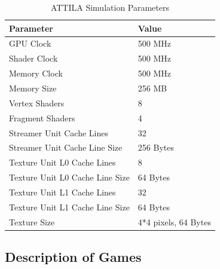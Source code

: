 \documentclass[pageno]{jpaper}
\begin{document}
\begin{table}[h!]
	\centering
	\begin{tabular}{|l|l|}
		\hline
		\textbf{Parameter} & \textbf{Value} \\
		\hline
		\hline
		GPU Clock & 500 MHz \\
		\hline
		Shader Clock & 500 MHz \\
		\hline
		Memory Clock & 500 MHz \\
		\hline
		Memory Size & 256 MB \\
		\hline
		Vertex Shaders & 8 \\
		\hline
		Fragment Shaders & 4 \\
		\hline
		Streamer Unit Cache Lines & 32 \\
		\hline
		Streamer Unit Cache Line Size & 256 Bytes \\
		\hline
		Texture Unit L0 Cache Lines & 8 \\
		\hline
		Texture Unit L0 Cache Line Size & 64 Bytes \\
		\hline
		Texture Unit L1 Cache Lines & 32 \\
		\hline
		Texture Unit L1 Cache Line Size & 64 Bytes \\
		\hline
		Texture Size & 4*4 pixels, 64 Bytes \\
		\hline
	\end{tabular}
	\caption{ATTILA Simulation Parameters}
	\label{table:simulationParameters}
\end{table}


\subsection{Description of Games}
\end{document}
